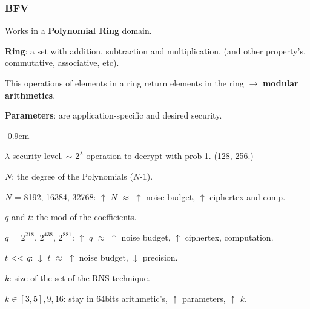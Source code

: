 \documentclass[10pt]{beamer}
\newcommand{\SubItem}[1]{
    {\setlength\itemindent{15pt} \item[-] #1}
}
\begin{document}
\begin{frame}
    \frametitle{BFV}
    Works in a \textbf{Polynomial Ring} domain.

 \vspace{-0.25cm}
\textbf{Ring}: a set with addition, subtraction and multiplication. (and other property's, commutative, associative, etc).

\pause
 \vspace{-0.25cm}
    This operations of elements in a ring return elements in the ring $\rightarrow$  \textbf{modular arithmetics}.

 \vspace{-0.25cm}
\textbf{Parameters}: are application-specific and desired security.

\pause
 \vspace{-0.3cm}
\begin{itemize}\itemsep-0.9em
    \item $\lambda$ security level. $\sim$ $2^\lambda$ operation to decrypt with prob 1. (128, 256.)
    \item $N$: the degree of the Polynomials ($N$-1).
        \SubItem{$N$ = 8192, 16384, 32768: $\uparrow$ $N$ $\approx$ $\uparrow$ noise budget, $\uparrow$ ciphertex and comp.}
\pause
    \item $q$ and $t$: the mod of the coefficients.
        \SubItem{$q$ = $2^{218}$,   $2^{438}$,  $2^{881}$: $\uparrow$ $q$ $\approx$ $\uparrow$ noise budget, $\uparrow$ ciphertex, computation.}
        \SubItem{$t$  << $q$: $\downarrow$ $t$ $\approx$ $\uparrow$ noise budget, $\downarrow$ precision.}
\pause
    \item $k$: size of the set of the RNS technique.
        \SubItem{$k\in [3,5], 9, 16$: stay in 64bits arithmetic's, $\uparrow$ parameters, $\uparrow$ $k$.}
\end{itemize}
\pause
\end{frame}


\end{document}
